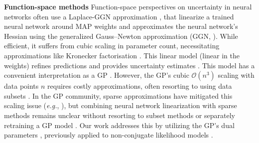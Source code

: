\documentclass{article}
\makeatletter
\newcommand{\eg}{\textit{e.g.\@}\xspace}
\makeatother
\begin{document}
\textbf{Function-space methods}
Function-space perspectives on uncertainty in neural networks often use a Laplace-GGN approximation \citep{daxberger2021laplace}, that linearize a trained neural network around MAP weights and approximates the neural network's Hessian using the generalized Gauss--Newton approximation (GGN, \cite{botev2017practical}). 
While efficient, it suffers from cubic scaling in parameter count, necessitating approximations like Kronecker factorisation \cite{martens2015optimizing, ritter2018kfac}.  This linear model (linear in the weights) refines predictions and provides uncertainty estimates \citep{immer2021scalable}. This model has a convenient interpretation as a GP \cite{immer2021scalable, khan2019approximate, maddox2021fast}.
%
However, the GP's cubic $\mathcal{O}(n^3)$ scaling with data points $n$ requires costly approximations, often resorting to using data subsets \cite{immer2021scalable}. In the GP community, sparse approximations have mitigated this scaling issue (\eg, \cite{titsias2009variational,hensman2013gaussian}), but combining neural network linearization with sparse methods remains  unclear without resorting to subset methods or separately retraining a GP model \cite{ortega2023variational} . Our work addresses this by utilizing the GP's dual parameters \cite{csato2002sparse}, previously applied to non-conjugate likelihood models \cite{adam2021dual}.

%
\end{document}
